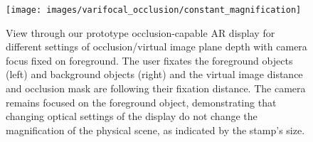 \begin{figure}
\centering
\texttt{[image: images/varifocal\_occlusion/constant\_magnification]}
\caption[Varifocal-Occlusion NED: Constant real-world magnification independent of virtual image plane distance]{View through our prototype occlusion-capable AR display for different settings of occlusion/virtual image plane depth with camera focus fixed on foreground. The user fixates the foreground objects (left) and background objects (right) and the virtual image distance and occlusion mask are following their fixation distance. The camera remains focused on the foreground object, demonstrating that changing optical settings of the display do not change the magnification of the physical scene, as indicated by the stamp's size. }
\label{fig:varifocal_occlusion:constant_magnification}
\end{figure}
